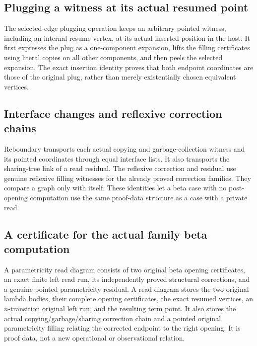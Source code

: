\subsection{Plugging a witness at its actual resumed point}
The selected-edge plugging operation keeps an arbitrary pointed witness, including an internal resume vertex, at its actual inserted position in the host. It first expresses the plug as a one-component expansion, lifts the filling certificates using literal copies on all other components, and then peels the selected expansion. The exact insertion identity proves that both endpoint coordinates are those of the original plug, rather than merely existentially chosen equivalent vertices.
\par{}

\subsection{Interface changes and reflexive correction chains}
Reboundary transports each actual copying and garbage-collection witness and its pointed coordinates through equal interface lists. It also transports the sharing-tree link of a read residual. The reflexive correction and residual use genuine reflexive filling witnesses for the already proved correction families. They compare a graph only with itself. These identities let a beta case with no post-opening computation use the same proof-data structure as a case with a private read.
\par{}

\subsection{A certificate for the actual family beta computation}
A parametricity read diagram consists of two original beta opening certificates, an exact finite left read run, its independently proved structural corrections, and a genuine pointed parametricity residual.
A read diagram stores the two original lambda bodies, their complete opening certificates, the exact resumed vertices, an $n$-transition original left run, and the resulting term point. It also stores the actual copying/garbage/sharing correction chain and a pointed original parametricity filling relating the corrected endpoint to the right opening. It is proof data, not a new operational or observational relation.

